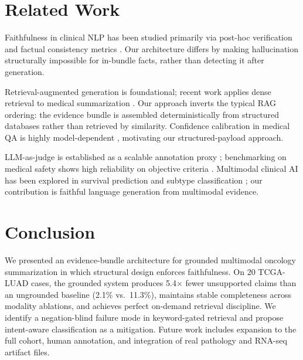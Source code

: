 \documentclass[11pt,twocolumn]{article}
\begin{document}
\section{Related Work}

Faithfulness in clinical NLP has been studied primarily via
post-hoc verification \cite{kryscinski2020evaluating} and factual consistency metrics \cite{min2023factscore}. Our architecture differs by making hallucination structurally impossible for in-bundle facts, rather than detecting it after generation.

Retrieval-augmented generation \cite{lewis2020rag} is foundational; recent work applies dense retrieval to medical summarization \cite{luo2025medsummrag}. Our approach inverts the typical RAG ordering: the evidence bundle is assembled deterministically from structured databases rather than retrieved by similarity. Confidence calibration in medical QA is highly model-dependent \cite{ozaki2025confidence}, motivating our structured-payload approach.

LLM-as-judge is established as a scalable annotation proxy \cite{zheng2023judging}; benchmarking on medical safety shows high reliability on objective criteria \cite{diekmann2025llm}. Multimodal clinical AI has been explored in survival prediction and subtype classification \cite{chen2022multimodal}; our contribution is faithful language generation from multimodal evidence.

\section{Conclusion}

We presented an evidence-bundle architecture for grounded multimodal
oncology summarization in which structural design enforces faithfulness. On 20 TCGA-LUAD cases, the
grounded system produces 5.4$\times$ fewer unsupported claims than an
ungrounded baseline (2.1\% vs.\ 11.3\%), maintains stable completeness across modality ablations, and achieves perfect on-demand
retrieval discipline. We identify a negation-blind failure mode in
keyword-gated retrieval and propose intent-aware classification as a
mitigation. Future work includes expansion to the full cohort,
human annotation, and integration of real pathology and
RNA-seq artifact files.

\end{document}
